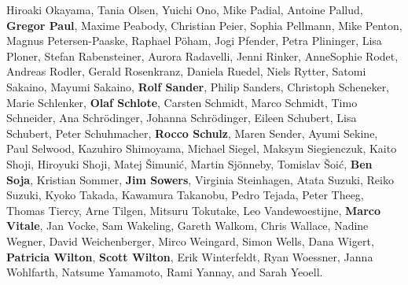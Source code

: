 Hiroaki Okayama,
Tania Olsen,
Yuichi Ono,
Mike Padial,
Antoine Pallud,
\textbf{Gregor Paul},
Maxime Peabody,
Christian Peier,
Sophia Pellmann,
Mike Penton,
Magnus Petersen-Paaske,
Raphael Pöham,
Jogi Pfender,
Petra Plininger,
Lisa Ploner,
Stefan Rabensteiner,
Aurora Radavelli,
Jenni Rinker,
AnneSophie Rodet,
Andreas Rodler,
Gerald  Rosenkranz,
Daniela Ruedel,
Niels Rytter,
Satomi Sakaino,
Mayumi Sakaino,
\textbf{Rolf Sander},
Philip  Sanders,
Christoph Scheneker,
Marie Schlenker,
\textbf{Olaf Schlote},
Carsten Schmidt,
Marco Schmidt,
Timo Schneider,
Ana Schrödinger,
Johanna Schrödinger,
Eileen Schubert,
Lisa Schubert,
Peter Schuhmacher,
\textbf{Rocco Schulz},
Maren Sender,
Ayumi Sekine,
Paul Selwood,
Kazuhiro Shimoyama,
Michael Siegel,
Maksym  Siegienczuk,
Kaito Shoji,
Hiroyuki Shoji,
Matej Šimunić,
Martin Sjönneby,
Tomislav Šoić,
\textbf{Ben Soja},
Kristian Sommer,
\textbf{Jim Sowers},
Virginia Steinhagen,
Atata Suzuki,
Reiko Suzuki,
Kyoko Takada,
Kawamura Takanobu,
Pedro Tejada,
Peter Theeg,
Thomas  Tiercy,
Arne Tilgen,
Mitsuru Tokutake,
Leo Vandewoestijne,
\textbf{Marco Vitale},
Jan Vocke,
Sam Wakeling,
Gareth Walkom,
Chris Wallace,
Nadine Wegner,
David Weichenberger,
Mirco Weingard,
Simon Wells,
Dana Wigert,
\textbf{Patricia  Wilton},
\textbf{Scott Wilton},
Erik Winterfeldt,
Ryan Woessner,
Janna Wohlfarth,
Natsume Yamamoto,
Rami Yannay,
and
Sarah Yeoell.
\endgroup
